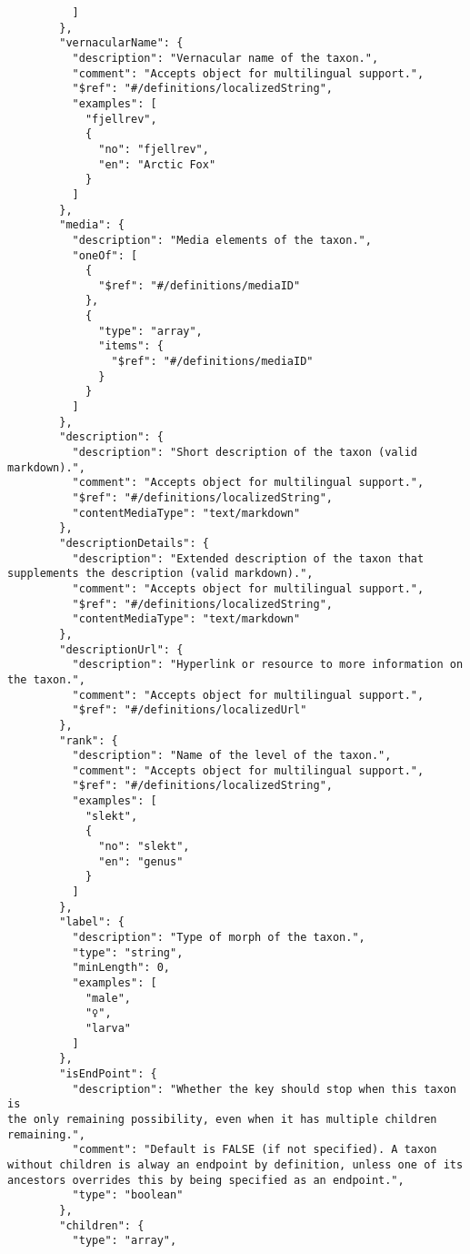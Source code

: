 \documentclass[10pt,letterpaper]{article}
\begin{document}
\begin{verbatim}
          ]
        },
        "vernacularName": {
          "description": "Vernacular name of the taxon.",
          "comment": "Accepts object for multilingual support.",
          "$ref": "#/definitions/localizedString",
          "examples": [
            "fjellrev",
            {
              "no": "fjellrev",
              "en": "Arctic Fox"
            }
          ]
        },
        "media": {
          "description": "Media elements of the taxon.",
          "oneOf": [
            {
              "$ref": "#/definitions/mediaID"
            },
            {
              "type": "array",
              "items": {
                "$ref": "#/definitions/mediaID"
              }
            }
          ]
        },
        "description": {
          "description": "Short description of the taxon (valid
markdown).",
          "comment": "Accepts object for multilingual support.",
          "$ref": "#/definitions/localizedString",
          "contentMediaType": "text/markdown"
        },
        "descriptionDetails": {
          "description": "Extended description of the taxon that
supplements the description (valid markdown).",
          "comment": "Accepts object for multilingual support.",
          "$ref": "#/definitions/localizedString",
          "contentMediaType": "text/markdown"
        },
        "descriptionUrl": {
          "description": "Hyperlink or resource to more information on
the taxon.",
          "comment": "Accepts object for multilingual support.",
          "$ref": "#/definitions/localizedUrl"
        },
        "rank": {
          "description": "Name of the level of the taxon.",
          "comment": "Accepts object for multilingual support.",
          "$ref": "#/definitions/localizedString",
          "examples": [
            "slekt",
            {
              "no": "slekt",
              "en": "genus"
            }
          ]
        },
        "label": {
          "description": "Type of morph of the taxon.",
          "type": "string",
          "minLength": 0,
          "examples": [
            "male",
            "♀",
            "larva"
          ]
        },
        "isEndPoint": {
          "description": "Whether the key should stop when this taxon is
the only remaining possibility, even when it has multiple children
remaining.",
          "comment": "Default is FALSE (if not specified). A taxon
without children is alway an endpoint by definition, unless one of its
ancestors overrides this by being specified as an endpoint.",
          "type": "boolean"
        },
        "children": {
          "type": "array",

\end{verbatim}
\end{document}
